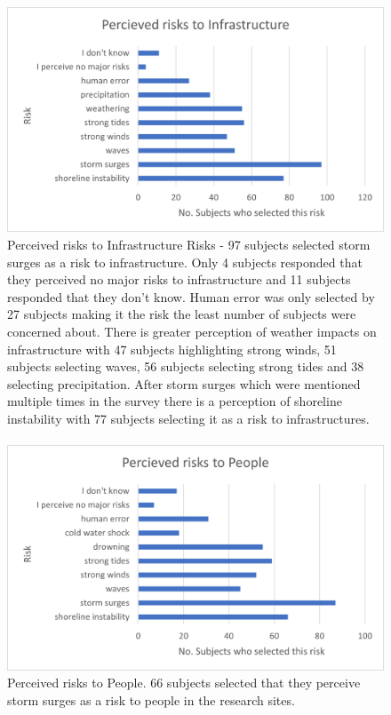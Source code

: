 \begin{figure}[H]
    \centering
    \includegraphics{fig_results/infrastructure-risks.png}
    \caption{Perceived risks to Infrastructure Risks - 97 subjects selected storm surges as a risk to infrastructure. Only 4 subjects responded that they perceived no major risks to infrastructure and 11 subjects responded that they don't know. Human error was only selected by 27 subjects making it the risk the least number of subjects were concerned about. There is greater perception of weather impacts on infrastructure with 47 subjects highlighting strong winds, 51 subjects selecting waves, 56 subjects selecting strong tides and 38 selecting precipitation. After storm surges which were mentioned multiple times in the survey there is a perception of shoreline instability with 77 subjects selecting it as a risk to infrastructures.   }
    \label{fig:my_label}
\end{figure}
\paragraph{}





\begin{figure}[H]
    \centering
    \includegraphics{fig_results/people-risks.png}
    \caption{Perceived risks to People. 66 subjects selected that they perceive storm surges as a risk to people in the research sites. }
    \label{fig:my_label}
\end{figure}
